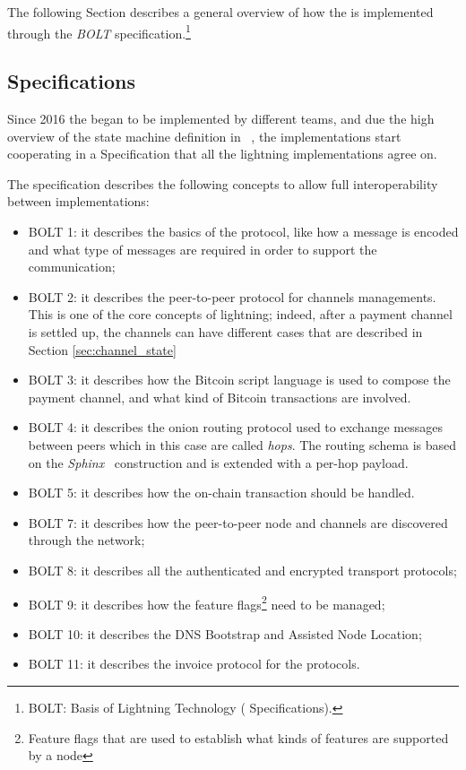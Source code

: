 The following Section describes a general overview of how the {\LN} is implemented through the
\emph{BOLT} specification.\footnote{BOLT: Basis of Lightning Technology ({\LN} Specifications).}

\subsection{{\LN} Specifications}

Since 2016 the {\LN} began to be implemented by different teams,
and due the high overview of the {\LN} state machine definition in ~\cite{lightning-network-paper},
the implementations start cooperating in a Specification that all the lightning implementations agree on.

The specification describes the following concepts to allow full interoperability between implementations:

\begin{itemize}
  \item BOLT 1: it describes the basics of the protocol, like how a message is encoded and what type of messages are required in order to support the communication;
  \item BOLT 2: it describes the peer-to-peer protocol for channels managements. This is one of the core concepts of lightning; indeed,  after a payment channel
        is settled up, the channels can have different cases that are described in Section \ref{sec:channel_state}
  \item BOLT 3: it describes how the Bitcoin script language is used to compose the
        payment channel, and what kind of Bitcoin transactions are involved.
  \item BOLT 4: it describes the onion routing protocol used to exchange messages between peers which in this case are called \emph{hops}.
        The routing schema is based on the \emph{Sphinx}~\cite{sphinx} construction and is extended with a per-hop payload.
  \item BOLT 5: it describes how the on-chain transaction should be handled.
  \item BOLT 7: it describes how the peer-to-peer node and channels are discovered through the network;
  \item BOLT 8: it describes all the authenticated and encrypted transport protocols;
  \item BOLT 9: it describes how the feature flags\footnote{Feature flags that are used to establish what kinds of features are supported by a node} need to be managed;
  \item BOLT 10: it describes the DNS Bootstrap and Assisted Node Location;
  \item BOLT 11: it describes the invoice protocol for the {\LN} protocols.
\end{itemize}


